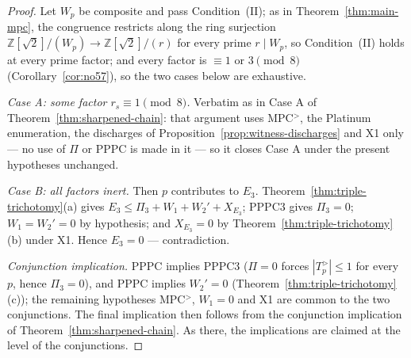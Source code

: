\documentclass[11pt]{amsart}
\theoremstyle{plain}
\theoremstyle{definition}
\theoremstyle{remark}
\numberwithin{equation}{section}
\newcommand{\Z}{\mathbb{Z}}
\begin{document}
\begin{proof}
Let $W_p$ be composite and pass Condition~(II); as in Theorem~\ref{thm:main-mpc}, the congruence restricts along the ring surjection $\Z[\sqrt 2]/(W_p) \to \Z[\sqrt 2]/(r)$ for every prime $r \mid W_p$, so Condition~(II) holds at every prime factor; and every factor is $\equiv 1$ or $3 \pmod 8$ (Corollary~\ref{cor:no57}), so the two cases below are exhaustive.

\emph{Case A: some factor $r_s \equiv 1 \pmod 8$.} Verbatim as in Case A of Theorem~\ref{thm:sharpened-chain}: that argument uses MPC$^{>}$, the Platinum enumeration, the discharges of Proposition~\ref{prop:witness-discharges} and X1 only --- no use of $\Pi$ or PPPC is made in it --- so it closes Case A under the present hypotheses unchanged.

\emph{Case B: all factors inert.} Then $p$ contributes to $E_3$. Theorem~\ref{thm:triple-trichotomy}(a) gives $E_3 \leq \Pi_3 + W_1 + W_2' + X_{E_3}$; PPPC3 gives $\Pi_3 = 0$; $W_1 = W_2' = 0$ by hypothesis; and $X_{E_3} = 0$ by Theorem~\ref{thm:triple-trichotomy}(b) under X1. Hence $E_3 = 0$ --- contradiction.

\emph{Conjunction implication.} PPPC implies PPPC3 ($\Pi = 0$ forces $|T_p^{>}| \leq 1$ for every $p$, hence $\Pi_3 = 0$), and PPPC implies $W_2' = 0$ (Theorem~\ref{thm:triple-trichotomy}(c)); the remaining hypotheses MPC$^{>}$, $W_1 = 0$ and X1 are common to the two conjunctions. The final implication then follows from the conjunction implication of Theorem~\ref{thm:sharpened-chain}. As there, the implications are claimed at the level of the conjunctions.
\end{proof}
\end{document}
